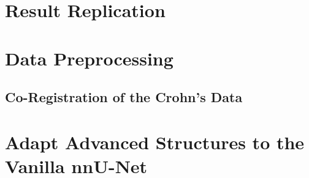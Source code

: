 \section{Result Replication}

\section{Data Preprocessing}
\subsection{Co-Registration of the Crohn's Data}
\section{Adapt Advanced Structures to the Vanilla nnU-Net}







